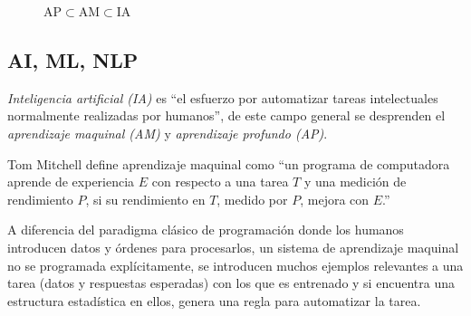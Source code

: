 \begin{wrapfigure}{r}{4.4cm}
	\caption[Inteligencia Artificial]{AP$\subset$AM$\subset$IA}
\end{wrapfigure}\label{fig:AI}\subsection {AI, ML, NLP}\label{subsec:intela}
\emph{Inteligencia artificial (IA)} es ``el esfuerzo por automatizar tareas intelectuales normalmente realizadas por humanos''\cite{cho18}, de este campo general se desprenden el \emph{aprendizaje maquinal (AM)} y \emph{aprendizaje profundo (AP)}.

Tom Mitchell \cite{mich19} define aprendizaje maquinal como ``un programa de computadora aprende de experiencia $E$ con respecto a una tarea $T$ y una medición de rendimiento $P$, si su rendimiento en $T$, medido por $P$, mejora con $E$.''

A diferencia del paradigma clásico de programación donde los humanos introducen datos y órdenes para procesarlos, un sistema de aprendizaje maquinal no se programada explícitamente, se introducen muchos ejemplos relevantes a una tarea (datos y respuestas esperadas) con los que es entrenado y si encuentra una estructura estadística en ellos, genera una regla para automatizar la tarea.


